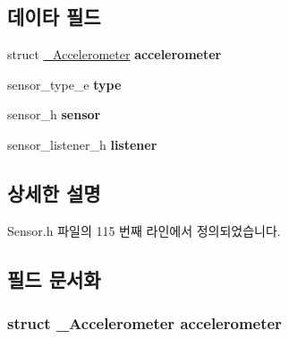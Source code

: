\subsection*{데이타 필드}
\begin{DoxyCompactItemize}
\item 
\hypertarget{struct___accelerometer_extend_a98b975c883ef9905587ac41117f74f4c}{struct \hyperlink{struct___accelerometer}{\-\_\-\-Accelerometer} {\bfseries accelerometer}}\label{struct___accelerometer_extend_a98b975c883ef9905587ac41117f74f4c}

\item 
\hypertarget{struct___accelerometer_extend_abffb09766da2fc510a79bb51f82a36e1}{sensor\-\_\-type\-\_\-e {\bfseries type}}\label{struct___accelerometer_extend_abffb09766da2fc510a79bb51f82a36e1}

\item 
\hypertarget{struct___accelerometer_extend_a5bae9b7801bc3808411925cde81d3f26}{sensor\-\_\-h {\bfseries sensor}}\label{struct___accelerometer_extend_a5bae9b7801bc3808411925cde81d3f26}

\item 
\hypertarget{struct___accelerometer_extend_aa977dfb866b24fd7d9a20a9a01b2fd1f}{sensor\-\_\-listener\-\_\-h {\bfseries listener}}\label{struct___accelerometer_extend_aa977dfb866b24fd7d9a20a9a01b2fd1f}

\end{DoxyCompactItemize}


\subsection{상세한 설명}


Sensor.\-h 파일의 115 번째 라인에서 정의되었습니다.



\subsection{필드 문서화}
\hypertarget{struct___accelerometer_extend_a98b975c883ef9905587ac41117f74f4c}{
\subsubsection[{accelerometer}]{\setlength{\rightskip}{0pt plus 5cm}struct {\bf \-\_\-\-Accelerometer} accelerometer}}\label{struct___accelerometer_extend_a98b975c883ef9905587ac41117f74f4c}


